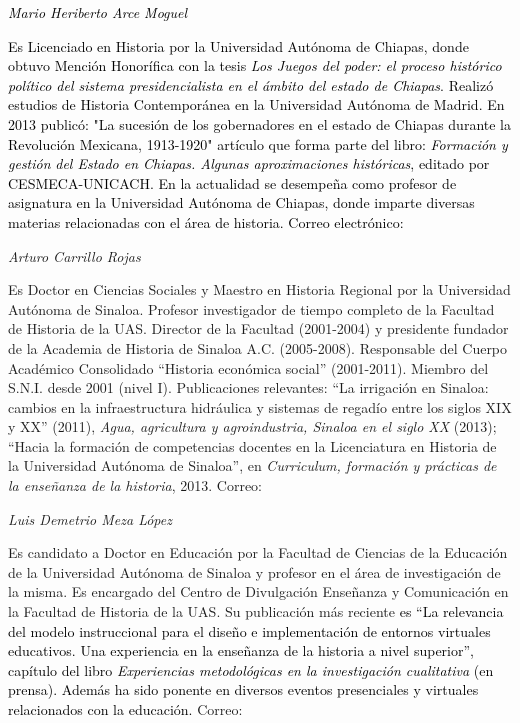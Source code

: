 \bigskip

\textit{\textcolor{black}{Mario Heriberto Arce Moguel}}

\textcolor{black}{Es Licenciado en Historia por la Universidad Autónoma de
Chiapas, donde obtuvo Mención Honorífica con la tesis
}\textit{\textcolor{black}{Los Juegos del poder: el proceso histórico
político del sistema presidencialista en el ámbito del estado de
Chiapas}}\textcolor{black}{. Realizó estudios de Historia Contemporánea en
la Universidad Autónoma de Madrid. En 2013 publicó: "La sucesión de los
gobernadores en el estado de Chiapas durante la Revolución Mexicana,
1913-1920" artículo que forma parte del libro:
}\textit{\textcolor{black}{Formación y gestión}}\textcolor{black}{
}\textit{\textcolor{black}{del Estado en Chiapas. Algunas aproximaciones
históricas}}\textcolor{black}{, editado por CESMECA-UNICACH. En la
actualidad se desempeña como profesor de asignatura en la Universidad
Autónoma de Chiapas, donde imparte diversas materias relacionadas con el
área de historia. Correo electrónico:
}\href{mailto:marioheribertoarce@hotmail.com}{}


\bigskip

{ 
\textit{Arturo Carrillo Rojas }}

{ 
Es Doctor en Ciencias Sociales y Maestro en Historia Regional por la
Universidad Autónoma de Sinaloa. Profesor investigador de tiempo completo
de la Facultad de Historia de la UAS. Director de la Facultad (2001-2004) y
presidente fundador de la Academia de Historia de Sinaloa A.C. (2005-2008).
Responsable del Cuerpo Académico Consolidado “Historia económica social”
(2001-2011). Miembro del S.N.I. desde 2001 (nivel I). Publicaciones
relevantes: “La irrigación en Sinaloa: cambios en la infraestructura
hidráulica y sistemas de regadío entre los siglos XIX y XX” (2011),
\textit{Agua, agricultura y agroindustria, Sinaloa en el siglo XX }(2013);
“Hacia la formación de competencias docentes en la Licenciatura en Historia
de la Universidad Autónoma de Sinaloa”, en \textit{Curriculum, formación y
prácticas de la enseñanza de la historia}, 2013. Correo:
\href{mailto:acarrillo_35@hotmail.com}{}}


\bigskip

{ 
\textit{Luis Demetrio Meza López}}

{ 
Es candidato a Doctor en Educación por la Facultad de Ciencias de la 
Educación de la Universidad Autónoma de Sinaloa y profesor en el área de
investigación de la misma. Es encargado del Centro de Divulgación Enseñanza
y Comunicación en la Facultad de Historia de la UAS. Su publicación más
reciente\textcolor{black}{ es “}\textcolor{black}{La relevancia del modelo
instruccional para el diseño e implementación de entornos virtuales
educativos. Una experiencia en la enseñanza de la historia a nivel
superior”, capí}\textcolor{black}{tulo del  libro
}\textit{\textcolor{black}{Experiencias metodológicas en la investigación
cualitativa}}\textcolor{black}{ (en prensa). Además ha sido ponente en
diversos eventos presenciales y virtuales relacionados con la educación.
}Correo:
\href{mailto:luismezalopez@hotmail.com}{}}



